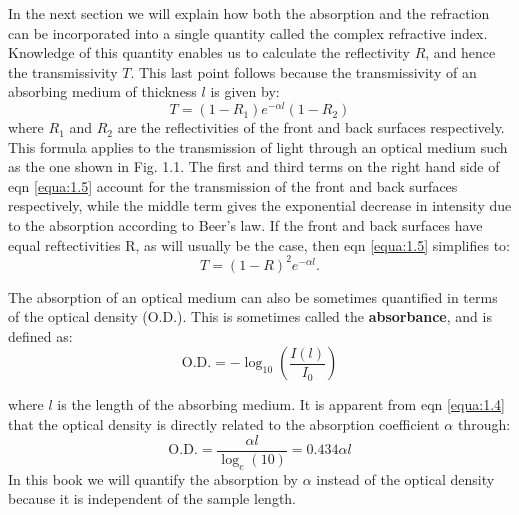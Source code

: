 \documentclass[12pt]{book}
\begin{document}

In the next section we will explain how both the absorption and the refraction can be incorporated into a single quantity called the complex refractive index. Knowledge of this quantity enables us to calculate the reflectivity $R$, and hence the transmissivity $T$. This last point follows because the transmissivity of an absorbing medium of thickness $l$ is given by:
\begin{equation}\label{equa:1.5}
  T=(1-R_1)e^{-\alpha l}(1-R_2)
\end{equation}
where $R_1$ and $R_2$ are the reflectivities of the front and back surfaces respectively. This formula applies to the transmission of light through an optical medium such as the one shown in Fig. 1.1. The first and third terms on the right hand side of eqn \ref{equa:1.5} account for the transmission of the front and back surfaces respectively, while the middle term gives the exponential decrease in intensity due to the absorption according to Beer's law. If the front and back surfaces have equal reftectivities R, as will usually be the case, then eqn \ref{equa:1.5} simplifies to:
\begin{equation}\label{equa:1.6}
  T=(1-R)^2e^{-\alpha l}.
\end{equation}

The absorption of an optical medium can also be sometimes quantified in terms of the optical density (O.D.). This is sometimes called the \textbf{absorbance}, and is defined as:
\begin{equation}\label{equa:1.7}
  \mathrm{O.D.}=-\log_{10}\left(\frac{I(l)}{I_0}\right)
\end{equation}

where $l$ is the length of the absorbing medium. It is apparent from eqn \ref{equa:1.4} that the optical density is directly related to the absorption coefficient $\alpha$ through:
\begin{equation}\label{equa:1.8}
  \mathrm{O.D.}=\frac{\alpha l}{\log_e(10)}=0.434\alpha l
\end{equation}
In this book we will quantify the absorption by $\alpha$ instead of the optical density because it is independent of the sample length.
\end{document}
